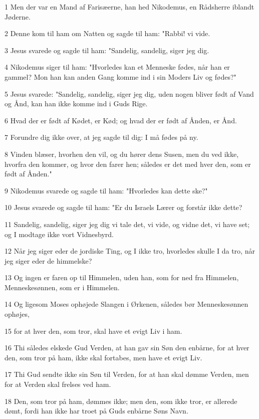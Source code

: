 \par 1 Men der var en Mand af Farisæerne, han hed Nikodemus, en Rådsherre iblandt Jøderne.
\par 2 Denne kom til ham om Natten og sagde til ham: "Rabbi! vi vide.
\par 3 Jesus svarede og sagde til ham: "Sandelig, sandelig, siger jeg dig.
\par 4 Nikodemus siger til ham: "Hvorledes kan et Menneske fødes, når han er gammel? Mon han kan anden Gang komme ind i sin Moders Liv og fødes?"
\par 5 Jesus svarede: "Sandelig, sandelig, siger jeg dig, uden nogen bliver født af Vand og Ånd, kan han ikke komme ind i Guds Rige.
\par 6 Hvad der er født af Kødet, er Kød; og hvad der er født af Ånden, er Ånd.
\par 7 Forundre dig ikke over, at jeg sagde til dig: I må fødes på ny.
\par 8 Vinden blæser, hvorhen den vil, og du hører dens Susen, men du ved ikke, hvorfra den kommer, og hvor den farer hen; således er det med hver den, som er født af Ånden."
\par 9 Nikodemus svarede og sagde til ham: "Hvorledes kan dette ske?"
\par 10 Jesus svarede og sagde til ham: "Er du Israels Lærer og forstår ikke dette?
\par 11 Sandelig, sandelig, siger jeg dig vi tale det, vi vide, og vidne det, vi have set; og I modtage ikke vort Vidnesbyrd.
\par 12 Når jeg siger eder de jordiske Ting, og I ikke tro, hvorledes skulle I da tro, når jeg siger eder de himmelske?
\par 13 Og ingen er faren op til Himmelen, uden han, som for ned fra Himmelen, Menneskesønnen, som er i Himmelen.
\par 14 Og ligesom Moses ophøjede Slangen i Ørkenen, således bør Menneskesønnen ophøjes,
\par 15 for at hver den, som tror, skal have et evigt Liv i ham.
\par 16 Thi således elskede Gud Verden, at han gav sin Søn den enbårne, for at hver den, som tror på ham, ikke skal fortabes, men have et evigt Liv.
\par 17 Thi Gud sendte ikke sin Søn til Verden, for at han skal dømme Verden, men for at Verden skal frelses ved ham.
\par 18 Den, som tror på ham, dømmes ikke; men den, som ikke tror, er allerede dømt, fordi han ikke har troet på Guds enbårne Søns Navn.
